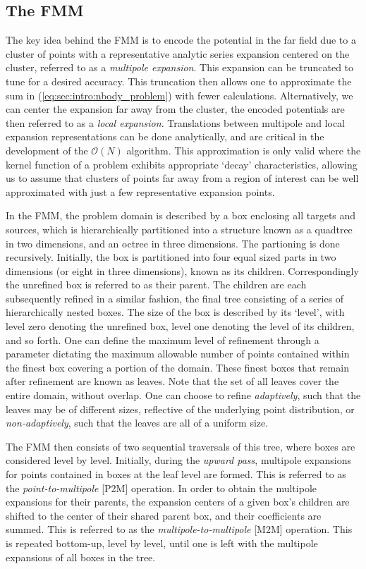 \documentclass{IEEEcsmag}
\begin{document}
\subsection{The FMM}\label{sec:intro:algorithm}

The key idea behind the FMM is to encode the potential in the far field due to a cluster of points with a representative analytic series expansion centered on the cluster, referred to as a \textit{multipole expansion}. This expansion can be truncated to tune for a desired accuracy. This truncation then allows one to approximate the sum in (\ref{eq:sec:intro:nbody_problem}) with fewer calculations. Alternatively, we can center the expansion far away from the cluster, the encoded potentials are then referred to as a \textit{local expansion}. Translations between multipole and local expansion representations can be done analytically, and are critical in the development of the $\mathcal{O}(N)$ algorithm. This approximation is only valid where the kernel function of a problem exhibits appropriate `decay' characteristics, allowing us to assume that clusters of points far away from a region of interest can be well approximated with just a few representative expansion points.

In the FMM, the problem domain is described by a box enclosing all targets and sources, which is hierarchically partitioned into a structure known as a quadtree in two dimensions, and an octree in three dimensions. The partioning is done recursively. Initially, the box is partitioned into four equal sized parts in two dimensions (or eight in three dimensions), known as its children. Correspondingly the unrefined box is referred to as their parent. The children are each subsequently refined in a similar fashion, the final tree consisting of a series of hierarchically nested boxes. The size of the box is described by its `level', with level zero denoting the unrefined box, level one denoting the level of its children, and so forth. One can define the maximum level of refinement through a parameter dictating the maximum allowable number of points contained within the finest box covering a portion of the domain. These finest boxes that remain after refinement are known as leaves. Note that the set of all leaves cover the entire domain, without overlap. One can choose to refine \textit{adaptively}, such that the leaves may be of different sizes, reflective of the underlying point distribution, or \textit{non-adaptively}, such that the leaves are all of a uniform size.

The FMM then consists of two sequential traversals of this tree, where boxes are considered level by level. Initially, during the \textit{upward pass}, multipole expansions for points contained in boxes at the leaf level are formed. This is referred to as the \textit{point-to-multipole} [P2M] operation. In order to obtain the multipole expansions for their parents, the expansion centers of a given box's children are shifted to the center of their shared parent box, and their coefficients are summed. This is referred to as the \textit{multipole-to-multipole} [M2M] operation. This is repeated bottom-up, level by level, until one is left with the multipole expansions of all boxes in the tree.
\end{document}
